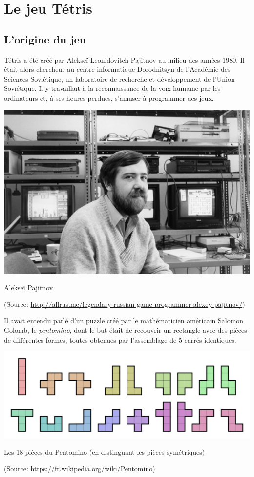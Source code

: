 \chapter{Le jeu Tétris}

\section{L'origine du jeu}

Tétris a été créé par Alekseï Leonidovitch Pajitnov au milieu des années 1980. Il était alors chercheur au centre informatique Dorodnitsyn de l'Académie des Sciences Soviétique, un laboratoire de recherche et développement de l'Union Soviétique. Il y travaillait à la reconnaissance de la voix humaine par les ordinateurs et, à ses heures perdues, s'amuser à programmer des jeux. 

\begin{center}
	\includegraphics[scale=0.45]{media/Pajitnov.jpg}
	
	Alekseï Pajitnov
	
	(Source: \url{http://allrus.me/legendary-russian-game-programmer-alexey-pajitnov/})
\end{center}

Il avait entendu parlé d'un puzzle créé par le mathématicien américain Salomon Golomb, le \textit{pentomino}, dont le but était de recouvrir un rectangle avec des pièces de différentes formes, toutes obtenues par l'assemblage de 5 carrés identiques.

\begin{center}
	\includegraphics[scale=0.25]{media/pentomino.png}
	
	Les 18 pièces du Pentomino (en distinguant les pièces symétriques)
	
	(Source: \url{https://fr.wikipedia.org/wiki/Pentomino})
\end{center}


